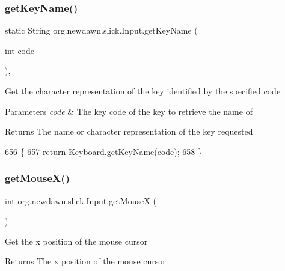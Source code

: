 \subsubsection{\texorpdfstring{get\+Key\+Name()}{getKeyName()}}
{\footnotesize\ttfamily static String org.\+newdawn.\+slick.\+Input.\+get\+Key\+Name (\begin{DoxyParamCaption}\item[{int}]{code }\end{DoxyParamCaption})\hspace{0.3cm}{\ttfamily [inline]}, {\ttfamily [static]}}

Get the character representation of the key identified by the specified code


\begin{DoxyParams}{Parameters}
{\em code} & The key code of the key to retrieve the name of \\
\hline
\end{DoxyParams}
\begin{DoxyReturn}{Returns}
The name or character representation of the key requested 
\end{DoxyReturn}

\begin{DoxyCode}
656                                               \{
657         \textcolor{keywordflow}{return} Keyboard.getKeyName(code);
658     \}
\end{DoxyCode}
\mbox{\label{classorg_1_1newdawn_1_1slick_1_1_input_a59e2e96e215f9b8510ca42afec448c5e}} 
\subsubsection{\texorpdfstring{get\+Mouse\+X()}{getMouseX()}}
{\footnotesize\ttfamily int org.\+newdawn.\+slick.\+Input.\+get\+MouseX (\begin{DoxyParamCaption}{ }\end{DoxyParamCaption})\hspace{0.3cm}{\ttfamily [inline]}}

Get the x position of the mouse cursor

\begin{DoxyReturn}{Returns}
The x position of the mouse cursor 
\end{DoxyReturn}

